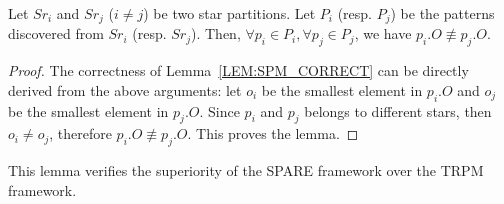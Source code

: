 \begin{lemma}
\label{LEM:SPM_CORRECT}
Let $Sr_i$ and $Sr_j$ ($i\neq j$) be two star partitions. Let $P_i$ (resp. $P_j$) be 
the patterns discovered from $Sr_i$ (resp. $Sr_j$). 
Then, $\forall p_i \in P_i, \forall p_j \in P_j$, we have $p_i.O \not\equiv p_j.O$.
\end{lemma}
\begin{proof}
The correctness of Lemma~\ref{LEM:SPM_CORRECT} can be directly derived from the above arguments:
let $o_i$ be the smallest element in $p_i.O$ and $o_j$ be the smallest element in $p_j.O$. 
Since $p_i$ and $p_j$ belongs to different stars, then $o_i \neq o_j$, 
therefore $p_i.O \not\equiv p_j.O$. This proves the lemma.
\end{proof}

This lemma verifies the superiority of the SPARE framework over the TRPM framework.

